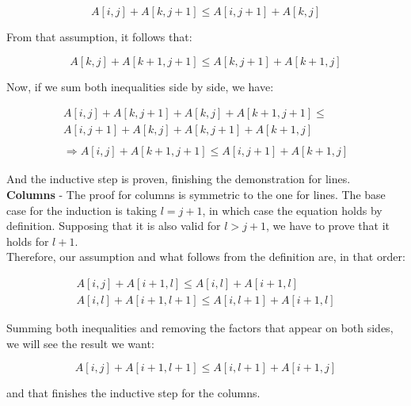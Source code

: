 \documentclass[8pt,a4paper]{article}
\begin{document}
\begin{equation*}
  A[i, j] + A[k, j+1] \leq A[i, j+1] + A[k, j]
\end{equation*}

  From that assumption, it follows that:

\begin{equation*}
  A[k, j] + A[k+1, j+1] \leq A[k, j+1] + A[k+1, j]
\end{equation*}

  Now, if we sum both inequalities side by side, we have:

\begin{equation*}
  \begin{split}
    A[i, j] + A[k, j+1] + A[k, j] + A[k+1, j+1] \leq \\
      A[i, j+1] + A[k, j] + A[k, j+1] + A[k+1, j] \\
      \\
    \Rightarrow A[i, j] + A[k+1, j+1] \leq A[i, j+1] + A[k+1, j]
  \end{split}
\end{equation*}

  And the inductive step is proven, finishing the demonstration for lines. \\

\textbf{Columns} - The proof for columns is symmetric to the one for lines. The
base case for the induction is taking $l = j + 1$, in which case the equation
holds by definition. Supposing that it is also valid for $l > j + 1$, we have
to prove that it holds for $l + 1$. \\

  Therefore, our assumption and what follows from the definition are, in that order:

\begin{equation*}
  \begin{split}
    A[i, j] + A[i+1, l] \leq A[i, l] + A[i+1, l] \\
    A[i, l] + A[i+1, l+1] \leq A[i, l+1] + A[i+1, l]
  \end{split}
\end{equation*}

  Summing both inequalities and removing the factors that appear on both sides,
we will see the result we want:

\begin{equation*}
  A[i, j] + A[i+1, l+1] \leq A[i, l+1] + A[i+1, j]
\end{equation*}

  and that finishes the inductive step for the columns. \\
\end{document}
